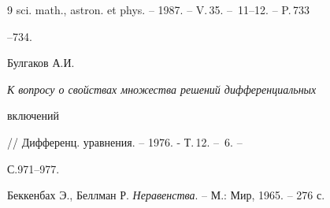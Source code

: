 \begin{thebibliography}{9}
sci. math., astron. et phys. -- 1987. -- V.\,35. -- \No\,11--12. -- P.\,733 


--734. 


 




Булгаков А.И. {\em К вопросу о свойствах множества решений дифференциальных 


включений} // Дифференц. уравнения. -- 1976. - Т.\,12. -- \No\,6. -- 


С.971--977. 


 




Беккенбах Э., Беллман Р. {\em Неравенства}. -- М.: Мир, 1965. -- 276 с. 


 


\end{thebibliography} 


 


\vskip 2cm 


 






 


 


